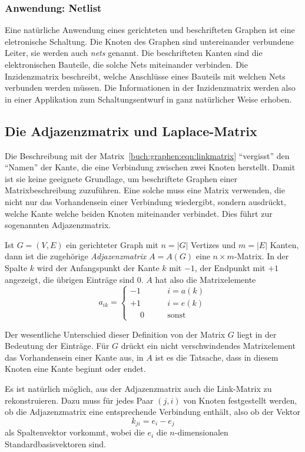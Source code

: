 \subsubsection{Anwendung: Netlist}
Eine natürliche Anwendung eines gerichteten und beschrifteten Graphen
ist eine eletronische Schaltung.
Die Knoten des Graphen sind untereinander verbundene Leiter, sie werden
auch {\em nets} genannt. 
Die beschrifteten Kanten sind die elektronischen Bauteile, die solche
Nets miteinander verbinden.
Die Inzidenzmatrix beschreibt, welche Anschlüsse eines Bauteils mit
welchen Nets verbunden werden müssen.
Die Informationen in der Inzidenzmatrix werden also in einer
Applikation zum Schaltungsentwurf in ganz natürlicher Weise erhoben.

\subsection{Die Adjazenzmatrix und Laplace-Matrix
\label{subsection:adjazenz-und-laplace-matrix}}
Die Beschreibung mit der Matrix~\eqref{buch:graphen:eqn:linkmatrix}
``vergisst'' den ``Namen'' der Kante, die eine Verbindung zwischen zwei
Knoten herstellt.
Damit ist sie keine geeignete Grundlage, um beschriftete Graphen einer
Matrixbeschreibung zuzuführen.
Eine solche muss eine Matrix verwenden, die nicht nur das Vorhandensein einer
Verbindung wiedergibt, sondern ausdrückt, welche Kante welche beiden
Knoten miteinander verbindet.
Dies führt zur sogenannten Adjazenzmatrix.

\begin{definition}
\label{buch:def:adjazenz-matrix}
Ist $G=(V,E)$ ein gerichteter Graph mit $n=|G|$ Vertizes und $m=|E|$ Kanten,
dann ist die zugehörige {\em Adjazenzmatrix} $A=A(G)$ eine $n\times m$-Matrix.
In der Spalte $k$ wird der Anfangspunkt der Kante $k$ mit $-1$, der Endpunkt
mit $+1$ angezeigt, die übrigen Einträge sind $0$.
$A$ hat also die Matrixelemente
\begin{equation}
a_{ik}
=
\begin{cases}
-1&\qquad i=a(k)\\
+1&\qquad i=e(k)\\
\phantom{+}0&\qquad\text{sonst}
\end{cases}
\label{buch:eqn:ajazenz-matrix}
\end{equation}
\end{definition}

Der wesentliche Unterschied dieser Definition von der Matrix $G$
liegt in der Bedeutung der Einträge.
Für $G$ drückt ein nicht verschwindendes Matrixelement das Vorhandensein
einer Kante aus, in $A$ ist es die Tatsache, dass in diesem Knoten
eine Kante beginnt oder endet.

Es ist natürlich möglich, aus der Adjazenzmatrix auch die Link-Matrix
zu rekonstruieren.
Dazu muss für jedes Paar $(j,i)$ von Knoten festgestellt werden,
ob die Adjazenzmatrix eine entsprechende Verbindung enthält, also ob der
Vektor 
\[
k_{ji} = e_i - e_j
\]
als Spaltenvektor vorkommt, wobei die $e_i$ die $n$-dimensionalen
Standardbasisvektoren sind.


